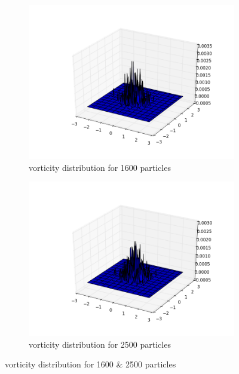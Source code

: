 \documentclass[a4paper,11pt]{article}
\begin{document}
\begin{figure}[h]
	\centering
	\begin{subfigure}[h]{.5\textwidth}
  		\centering
  		\includegraphics[width=.8\linewidth]{vorticity_distribution_for_1600_particles.png }
  		\caption{vorticity distribution for 1600 particles }
  		\label{fig:16}
	\end{subfigure}
	\begin{subfigure}[h]{.5\textwidth}
  		\centering
  		\includegraphics[width=.8\linewidth]{vorticity_distribution_for_2500_particles.png}
  		\caption{vorticity distribution for 2500 particles}
  		\label{fig:25}
	\end{subfigure}%
	\label{fig:Question 1a}
  \caption{vorticity distribution for 1600 \& 2500 particles}
\end{figure}
\end{document}
